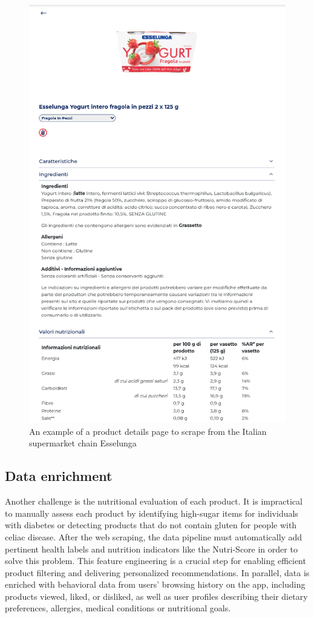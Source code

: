 \begin{figure}[H]
    \centering
    \includegraphics[scale=0.55]{images/product_example.png}
    \caption{An example of a product details page to scrape from the Italian supermarket chain Esselunga} 
    \label{fig:product_example}
\end{figure}


\subsection{Data enrichment}
Another challenge is the nutritional evaluation of each product. It is
impractical to manually assess each product by identifying high-sugar
items for individuals with diabetes or detecting products that do not
contain gluten for people with celiac disease. After the web scraping, the
data pipeline must automatically add pertinent health labels and nutrition
indicators like the Nutri-Score in order to solve this problem. This feature
engineering is a crucial step for enabling efficient product filtering and
delivering personalized recommendations. In parallel, data is enriched
with behavioral data from users’ browsing history on the app, including
products viewed, liked, or disliked, as well as user profiles describing their
dietary preferences, allergies, medical conditions or nutritional goals.

